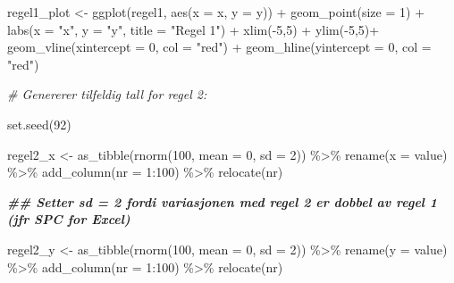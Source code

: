 \documentclass[
]{book}
\newenvironment{Shaded}{\begin{snugshade}}{\end{snugshade}}
\newcommand{\AttributeTok}[1]{\textcolor[rgb]{0.77,0.63,0.00}{#1}}
\newcommand{\CommentTok}[1]{\textcolor[rgb]{0.56,0.35,0.01}{\textit{#1}}}
\newcommand{\DecValTok}[1]{\textcolor[rgb]{0.00,0.00,0.81}{#1}}
\newcommand{\DocumentationTok}[1]{\textcolor[rgb]{0.56,0.35,0.01}{\textbf{\textit{#1}}}}
\newcommand{\FunctionTok}[1]{\textcolor[rgb]{0.00,0.00,0.00}{#1}}
\newcommand{\NormalTok}[1]{#1}
\newcommand{\OtherTok}[1]{\textcolor[rgb]{0.56,0.35,0.01}{#1}}
\newcommand{\SpecialCharTok}[1]{\textcolor[rgb]{0.00,0.00,0.00}{#1}}
\newcommand{\StringTok}[1]{\textcolor[rgb]{0.31,0.60,0.02}{#1}}
\begin{document}
\begin{Shaded}
\begin{Highlighting}[]
\NormalTok{regel1\_plot }\OtherTok{\textless{}{-}} \FunctionTok{ggplot}\NormalTok{(regel1, }\FunctionTok{aes}\NormalTok{(}\AttributeTok{x =}\NormalTok{ x, }\AttributeTok{y =}\NormalTok{ y)) }\SpecialCharTok{+}
  \FunctionTok{geom\_point}\NormalTok{(}\AttributeTok{size =} \DecValTok{1}\NormalTok{) }\SpecialCharTok{+} \FunctionTok{labs}\NormalTok{(}\AttributeTok{x =} \StringTok{"x"}\NormalTok{, }\AttributeTok{y =} \StringTok{"y"}\NormalTok{, }\AttributeTok{title =} \StringTok{"Regel 1"}\NormalTok{) }\SpecialCharTok{+} \FunctionTok{xlim}\NormalTok{(}\SpecialCharTok{{-}}\DecValTok{5}\NormalTok{,}\DecValTok{5}\NormalTok{) }\SpecialCharTok{+} \FunctionTok{ylim}\NormalTok{(}\SpecialCharTok{{-}}\DecValTok{5}\NormalTok{,}\DecValTok{5}\NormalTok{)}\SpecialCharTok{+} \FunctionTok{geom\_vline}\NormalTok{(}\AttributeTok{xintercept =} \DecValTok{0}\NormalTok{, }\AttributeTok{col =} \StringTok{"red"}\NormalTok{) }\SpecialCharTok{+} \FunctionTok{geom\_hline}\NormalTok{(}\AttributeTok{yintercept =} \DecValTok{0}\NormalTok{, }\AttributeTok{col =} \StringTok{"red"}\NormalTok{)}

\CommentTok{\# Genererer tilfeldig tall for regel 2:}

\FunctionTok{set.seed}\NormalTok{(}\DecValTok{92}\NormalTok{)}

\NormalTok{regel2\_x }\OtherTok{\textless{}{-}} \FunctionTok{as\_tibble}\NormalTok{(}\FunctionTok{rnorm}\NormalTok{(}\DecValTok{100}\NormalTok{, }\AttributeTok{mean =} \DecValTok{0}\NormalTok{, }\AttributeTok{sd =} \DecValTok{2}\NormalTok{)) }\SpecialCharTok{\%\textgreater{}\%}
  \FunctionTok{rename}\NormalTok{(}\AttributeTok{x =}\NormalTok{ value) }\SpecialCharTok{\%\textgreater{}\%}
  \FunctionTok{add\_column}\NormalTok{(}\AttributeTok{nr =} \DecValTok{1}\SpecialCharTok{:}\DecValTok{100}\NormalTok{) }\SpecialCharTok{\%\textgreater{}\%}
  \FunctionTok{relocate}\NormalTok{(nr)}

\DocumentationTok{\#\# Setter sd = 2 fordi variasjonen med regel 2 er dobbel av regel 1 (jfr SPC for Excel)}

\NormalTok{regel2\_y }\OtherTok{\textless{}{-}} \FunctionTok{as\_tibble}\NormalTok{(}\FunctionTok{rnorm}\NormalTok{(}\DecValTok{100}\NormalTok{, }\AttributeTok{mean =} \DecValTok{0}\NormalTok{, }\AttributeTok{sd =} \DecValTok{2}\NormalTok{)) }\SpecialCharTok{\%\textgreater{}\%}
  \FunctionTok{rename}\NormalTok{(}\AttributeTok{y =}\NormalTok{ value) }\SpecialCharTok{\%\textgreater{}\%}
  \FunctionTok{add\_column}\NormalTok{(}\AttributeTok{nr =} \DecValTok{1}\SpecialCharTok{:}\DecValTok{100}\NormalTok{) }\SpecialCharTok{\%\textgreater{}\%}
  \FunctionTok{relocate}\NormalTok{(nr)}


\end{Highlighting}
\end{Shaded}
\end{document}
